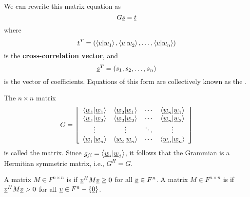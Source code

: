 We can rewrite this matrix equation as
\begin{equation*}
G \underline{s} = \underline{t}
\end{equation*}
where
\begin{equation*}
\underline{t}^T = 
\left(
\left\langle \underline{v} | \underline{w}_1 \right\rangle,
\left\langle \underline{v} | \underline{w}_2 \right\rangle, \ldots,
\left\langle \underline{v} | \underline{w}_n \right\rangle \right)
\end{equation*}
is the \textbf{cross-correlation vector}, and
\begin{equation*}
\underline{s}^T = 
\left( s_1, s_2, \ldots, s_n \right)
\end{equation*}
is the vector of coefficients.
Equations of this form are collectively known as the .

\begin{definition}
The $n \times n$ matrix
\begin{equation} \label{equation:GrammianMatrix}
G = \left[ \begin{array}{cccc}
\left\langle \underline{w}_1 | \underline{w}_1 \right\rangle
& \left\langle \underline{w}_2 | \underline{w}_1 \right\rangle & \cdots
& \left\langle \underline{w}_n | \underline{w}_1 \right\rangle \\
\left\langle \underline{w}_1 | \underline{w}_2 \right\rangle
& \left\langle \underline{w}_2 | \underline{w}_2 \right\rangle & \cdots
& \left\langle \underline{w}_n | \underline{w}_2 \right\rangle \\
\vdots & \vdots & \ddots & \vdots \\
\left\langle \underline{w}_1 | \underline{w}_n \right\rangle
& \left\langle \underline{w}_2 | \underline{w}_n \right\rangle & \cdots
& \left\langle \underline{w}_n | \underline{w}_n \right\rangle
\end{array} \right]
\end{equation}
is called the  matrix.
Since $g_{ji} = \left\langle \underline{w}_i | \underline{w}_j \right\rangle$, it follows that the Grammian is a Hermitian symmetric matrix, i.e., $G^H = G$.
\end{definition}

\begin{definition}
A matrix $M\in F^{n \times n}$ is  if $\underline{v}^H M \underline{v} \geq 0$ for all $\underline{v} \in F^n$.
A matrix $M\in F^{n \times n}$ is  if $\underline{v}^H M \underline{v} > 0$ for all $\underline{v} \in F^n - \left\{ \underline{0} \right\}$.
\end{definition}

